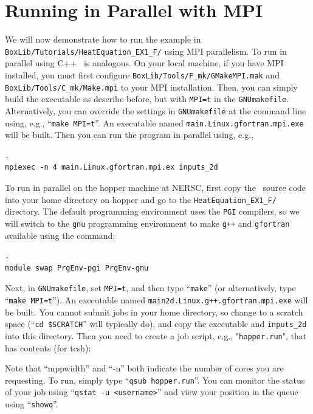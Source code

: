 \section{Running in Parallel with MPI}
We will now demonstrate how to run the example in {\tt BoxLib/Tutorials/HeatEquation\_EX1\_F/}
using MPI parallelism.  To run in parallel using C++ \BoxLib\ is analogous.
On your local machine, if you have MPI installed, you must first configure
{\tt BoxLib/Tools/F\_mk/GMakeMPI.mak} and {\tt BoxLib/Tools/C\_mk/Make.mpi}
to your MPI installation.  Then, you 
can simply build the executable as describe before, but with {\tt MPI=t} 
in the {\tt GNUmakefile}.  Alternatively, you can override the settings in 
{\tt GNUmakefile} at the command line using, e.g., ``{\tt make MPI=t}''.  
An executable named {\tt main.Linux.gfortran.mpi.exe} will be built.
Then you can run the program in parallel using, e.g.,
\begin{lstlisting}[backgroundcolor=\color{light-red}].
mpiexec -n 4 main.Linux.gfortran.mpi.ex inputs_2d
\end{lstlisting}

To run in parallel on the hopper machine at NERSC, first copy the \BoxLib\ source code
into your home directory on hopper and go to the {\tt HeatEquation\_EX1\_F/} directory.
The default programming environment uses the {\tt PGI} compilers, so we will switch to the
{\tt gnu} programming environment to make {\tt g++} and {\tt gfortran} available
using the command:
\begin{lstlisting}[backgroundcolor=\color{light-red}].
module swap PrgEnv-pgi PrgEnv-gnu
\end{lstlisting}
Next, in {\tt GNUmakefile}, set {\tt MPI=t}, and then type ``{\tt make}''
(or alternatively, type ``{\tt make MPI=t}'').
An executable named {\tt main2d.Linux.g++.gfortran.mpi.exe} will be built.
You cannot submit jobs in your home directory, so change to a scratch space
(``{\tt cd \$SCRATCH}'' will typically do), and copy the executable and
{\tt inputs\_2d} into this directory.  Then you need to create a job script,
e.g., "{\tt hopper.run}", that has contents (for tcsh):

Note that ``mppwidth'' and ``-n'' both indicate the number of cores you are requesting.
To run, simply type ``{\tt qsub hopper.run}''.  You can monitor the status of your job
using ``{\tt qstat -u <username>}'' and view your position in the queue 
using ``{\tt showq}''.

